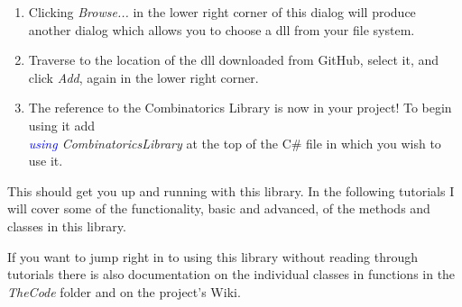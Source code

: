 \documentclass {article}
\begin{document}
\begin{enumerate}
\begin{figure}[H]
	\end {figure}
	\item Clicking \textit{Browse...} in the lower right corner of this dialog will produce another dialog which allows you to choose a dll from your file system.
	\item Traverse to the location of the dll downloaded from GitHub, select it, and click \textit{Add}, again in the lower right corner. 
	\item The reference to the Combinatorics Library is now in your project! To begin using it add \\ \textit{\textcolor{blue}{using} CombinatoricsLibrary} at the top of the C\# file in which you wish to use it.
\end{enumerate}

\vspace{10mm}

This should get you up and running with this library. In the following tutorials I will cover some of the functionality, basic and advanced, of the methods and classes in this library. \\

\vspace{5mm}

If you want to jump right in to using this library without reading through tutorials there is also documentation on the individual classes in functions in the \textit{TheCode} folder and on the project's Wiki.
\end{document}
